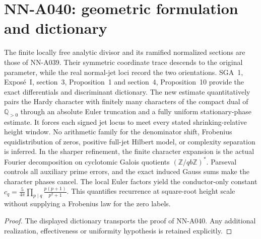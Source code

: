 \section{NN-A040: geometric formulation and dictionary}
\begin{geometricstatement}[NN-A040]
The finite locally free analytic divisor and its ramified normalized sections are those of NN-A039. Their symmetric coordinate trace descends to the original parameter, while the real normal-jet loci record the two orientations. SGA~1, Expos\'e~I, section~3, Proposition~1 and section~4, Proposition~10 provide the exact differentials and discriminant dictionary. The new estimate quantitatively pairs the Hardy character with finitely many characters of the compact dual of $\mathbb Q_{>0}$ through an absolute Euler truncation and a fully uniform stationary-phase estimate. It forces each signed jet locus to meet every stated shrinking-relative height window. No arithmetic family for the denominator shift, Frobenius equidistribution of zeros, positive full-jet Hilbert model, or complexity separation is inferred. In the sharper refinement, the finite character expansion is the actual Fourier decomposition on cyclotomic Galois quotients $(\mathbb Z/qb\mathbb Z)^*$. Parseval controls all auxiliary prime errors, and the exact induced Gauss sums make the character phases cancel. The local Euler factors yield the conductor-only constant $c_q=\frac5{4\pi}\prod_{p\mid q}\frac{p(p+1)}{p^2+1}$. This quantifies recurrence at square-root height scale without supplying a Frobenius law for the zero labels.
\end{geometricstatement}
\begin{proof} The displayed dictionary transports the proof of NN-A040. Any additional realization, effectiveness or uniformity hypothesis is retained explicitly.\end{proof}


